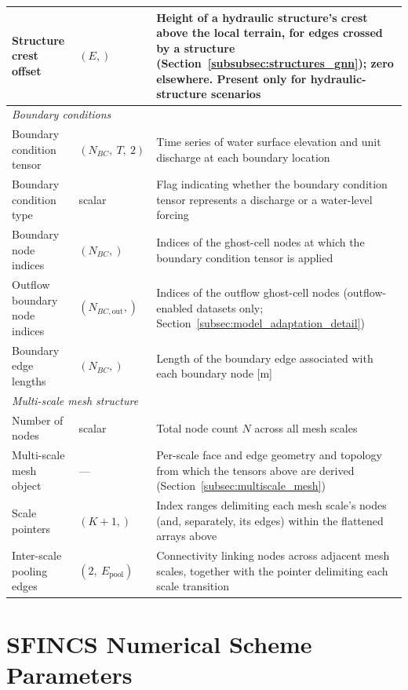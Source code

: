 \documentclass[12pt,a4paper]{report}
\begin{document}
{\begin{table}[H]
\begin{tabular}{p{4cm}p{2.3cm}p{7.2cm}}
        Structure crest offset & $(E,)$ & Height of a hydraulic structure's crest above the local terrain, for edges crossed by a structure (Section~\ref{subsubsec:structures_gnn}); zero elsewhere. Present only for hydraulic-structure scenarios \\
        \midrule
        \multicolumn{3}{l}{\emph{Boundary conditions}} \\
        Boundary condition tensor & $(N_{BC},\ T,\ 2)$ & Time series of water surface elevation and unit discharge at each boundary location \\
        Boundary condition type & scalar & Flag indicating whether the boundary condition tensor represents a discharge or a water-level forcing \\
        Boundary node indices & $(N_{BC},)$ & Indices of the ghost-cell nodes at which the boundary condition tensor is applied \\
        Outflow boundary node indices & $(N_{BC,\text{out}},)$ & Indices of the outflow ghost-cell nodes (outflow-enabled datasets only; Section~\ref{subsec:model_adaptation_detail}) \\
        Boundary edge lengths & $(N_{BC},)$ & Length of the boundary edge associated with each boundary node [m] \\
        \midrule
        \multicolumn{3}{l}{\emph{Multi-scale mesh structure}} \\
        Number of nodes & scalar & Total node count $N$ across all mesh scales \\
        Multi-scale mesh object & --- & Per-scale face and edge geometry and topology from which the tensors above are derived (Section~\ref{subsec:multiscale_mesh}) \\
        Scale pointers & $(K+1,)$ & Index ranges delimiting each mesh scale's nodes (and, separately, its edges) within the flattened arrays above \\
        Inter-scale pooling edges & $(2,\ E_\text{pool})$ & Connectivity linking nodes across adjacent mesh scales, together with the pointer delimiting each scale transition \\
        \bottomrule
    \end{tabular}
\end{table}


\chapter{SFINCS Numerical Scheme Parameters}
\label{app:sfincs_params}

}
\end{document}
